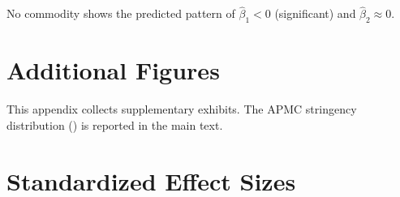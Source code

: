 \documentclass[12pt]{article}
\begin{document}
No commodity shows the predicted pattern of $\hat{\beta}_1 < 0$ (significant) and $\hat{\beta}_2 \approx 0$.


\section{Additional Figures}
\label{app:additional}

This appendix collects supplementary exhibits. The APMC stringency distribution () is reported in the main text.


\section{Standardized Effect Sizes}
\label{sec:sde}
\end{document}
